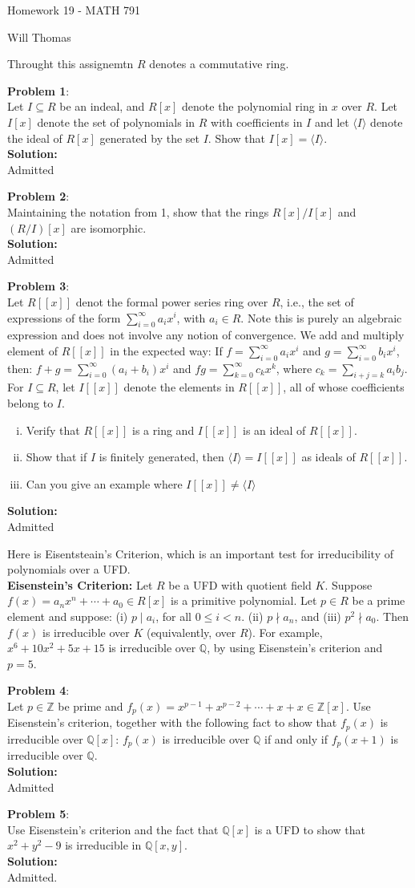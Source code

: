 \documentclass[11pt]{article}
\newcommand{\prob}[3]{\begin{flushleft}
        \textbf{Problem #1}: \\
        #2 
		\textbf{Solution:} 
		#3

\end{flushleft}}
\newcommand{\makeHWtitle}[1]{
    \begin{center}
    \Large{Homework #1 - MATH 791} 
        \vspace{5pt}
        
        \normalsize{Will Thomas}
        \vspace{5pt}
    \end{center}
}
\begin{document}
\makeHWtitle{19}
Throught this assignemtn $R$ denotes a commutative ring.

\prob{1}{
  Let $I \subseteq R$ be an indeal, and $R[x]$ denote the polynomial ring in $x$ over $R$. Let $I[x]$ denote the set of polynomials in $R$ with coefficients in $I$ and let $\langle I \rangle$ denote the ideal of $R[x]$ generated by the set $I$.
  Show that $I[x] = \langle I \rangle$. \\
}{ \\
  Admitted
}

\prob{2}{
Maintaining the notation from 1, show that the rings $R[x]/I[x]$ and $(R/I)[x]$ are isomorphic. \\
}{\\
Admitted
}

\prob{3}{
  Let $R[[x]]$ denot the formal power series ring over $R$, i.e., the set of expressions of the form $\sum_{i = 0}^{\infty}a_ix^i$, with $a_i \in R$.
  Note this is purely an algebraic expression and does not involve any notion of convergence.
  We add and multiply element of $R[[x]]$ in the expected way:
  If $f = \sum_{i=0}^{\infty}a_ix^i$ and $g = \sum_{i=0}^{\infty}b_ix^i$, then:
  $f + g = \sum_{i=0}^{\infty}(a_i + b_i)x^i$ and $fg = \sum_{k=0}^{\infty}c_kx^k$, where $c_k = \sum_{i + j = k}a_ib_j$. For $I \subseteq R$, let $I[[x]]$ denote the elements in $R[[x]]$, all of whose coefficients belong to $I$.
  \begin{enumerate}[(i)]
    \item Verify that $R[[x]]$ is a ring and $I[[x]]$ is an ideal of $R[[x]]$.
    \item Show that if $I$ is finitely generated, then $\langle I \rangle = I[[x]]$ as ideals of $R[[x]]$.
    \item Can you give an example where $I[[x]] \neq \langle I \rangle$
  \end{enumerate}
}{ \\
  Admitted
}
Here is Eisentsteain's Criterion, which is an important test for irreducibility of polynomials over a UFD. \\
\textbf{Eisenstein's Criterion:} Let $R$ be a UFD with quotient field $K$.
Suppose $f(x) = a_nx^n + \cdots + a_0 \in R[x]$ is a primitive polynomial.
Let $p \in R$ be a prime element and suppose: (i) $p \mid a_i$, for all $0 \leq i < n$.
(ii) $p \nmid a_n$, and (iii) $p^2 \nmid a_0$.
Then $f(x)$ is irreducible over $K$ (equivalently, over $R$).
For example, $x^6 + 10x^2 + 5x + 15$ is irreducible over $\mathbb{Q}$, by using Eisenstein's criterion and $p = 5$.

\prob{4}{
  Let $p \in \mathbb{Z}$ be prime and $f_p(x) = x^{p-1} + x^{p-2} + \cdots + x + x \in \mathbb{Z}[x]$. Use Eisenstein's criterion, together with the following fact to show that $f_p(x)$ is irreducible over $\mathbb{Q}[x]$: $f_p(x)$ is irreducible over $\mathbb{Q}$ if and only if $f_p(x + 1)$ is irreducible over $\mathbb{Q}$. \\
}{ \\
  Admitted
}

\prob{5}{
  Use Eisenstein's criterion and the fact that $\mathbb{Q}[x]$ is a UFD to show that $x^2 + y^2 - 9$ is irreducible in $\mathbb{Q}[x,y]$. \\
}{ \\
  Admitted.
}
\end{document}
